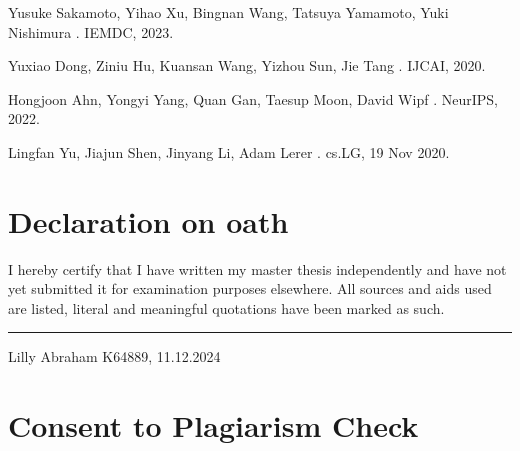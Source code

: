 \documentclass{report} %
\begin{document}
\begin{thebibliography}{00}
    \newblock Yusuke Sakamoto, Yihao Xu, Bingnan Wang, Tatsuya Yamamoto, Yuki Nishimura
    .
    \newblock IEMDC, 2023.

    \newblock Yuxiao Dong, Ziniu Hu, Kuansan Wang, Yizhou Sun, Jie Tang
    .
    \newblock IJCAI, 2020.

    \newblock Hongjoon Ahn, Yongyi Yang, Quan Gan, Taesup Moon, David Wipf
    .
    \newblock NeurIPS, 2022.

    \newblock Lingfan Yu, Jiajun Shen, Jinyang Li, Adam Lerer
    .
    \newblock cs.LG, 19 Nov 2020.

    \end{thebibliography}
\newpage 

\newpage 

\chapter*{Declaration on oath}

\vspace{1cm}

\noindent I hereby certify that I have written my master thesis independently and have not yet submitted it for examination purposes elsewhere. All sources and aids used are listed, literal and meaningful quotations have been marked as such.

\vspace{3cm}
\hfill\rule{15cm}{0.4pt} %

\begin{center}
    Lilly Abraham K64889, 11.12.2024 %
\end{center}

\newpage 

\chapter*{Consent to Plagiarism Check}
\vspace{1cm}
\end{document}
